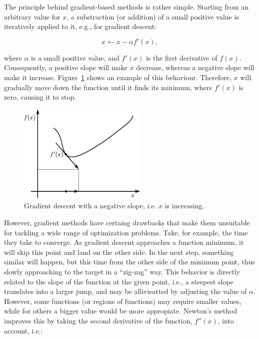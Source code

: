 The principle behind gradient-based methods is rather simple. Starting
from an arbitrary value for $x$, a substraction (or addition) of
a small positive value is iteratively applied to it, e.g., for gradient
descent:

\begin{equation}
x\leftarrow x-\alpha f'(x),
\end{equation}


\noindent where $\alpha$ is a small positive value, and $f'(x)$
is the first derivative of $f(x)$. Consequently, a positive slope
will make $x$ decrease, whereas a negative slope will make it increase.
Figure~\ref{fig:02-gradient_descent} shows an example of this behaviour.
Therefore, $x$ will gradually move down the function until it finds
its minimum, where $f'(x)$ is zero, causing it to stop.

\begin{figure}
\centering

\includegraphics[width=0.55\textwidth]{02-background_and_motivation/img/gradient_descent}

\caption{Gradient descent with a negative slope, i.e. $x$ is increasing. \label{fig:02-gradient_descent}}
\end{figure}


However, gradient methods have certaing drawbacks that make them unsuitable
for tackling a wide range of optimization problems. Take, for example,
the time they take to converge. As gradient descent approaches a function
minimum, it will skip this point and land on the other side. In the
next step, something similar will happen, but this time from the other
side of the minimum point, thus slowly approaching to the target in
a ``zig-zag'' way. This behavior is directly related to the slope
of the function at the given point, i.e., a steepest slope translates
into a larger jump, and may be allivieatted by adjusting the value
of $\alpha$. However, some functions (or regions of functions) may
require smaller values, while for others a bigger value would be more
appropiate. Newton's method improves this by taking the second derivative
of the function, $f''(x)$, into account, i.e.:


